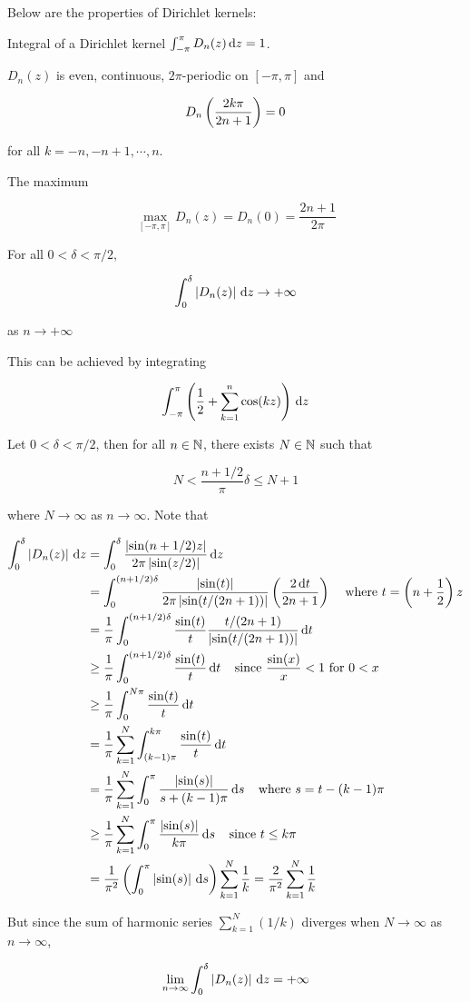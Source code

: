 \documentclass[a4paper,12pt]{article}
\begin{document}
\begin{pst}
  Below are the properties of Dirichlet kernels:

  \begin{alist}
    \item Integral of a Dirichlet kernel $\int_{-\pi}^{\pi}D_{n}(z)\,\mathrm{d} z=1$.
    \item $D_{n}(z)$ is even, continuous, $2\pi$-periodic on $[-\pi,\pi]$ and
    
    $$D_{n}\left( \frac{2k\pi}{2n+1}\right)=0$$\s

    for all $k=-n,-n+1,\cdots,n$.
    \item The maximum
    
    $$\max_{[-\pi,\pi]}D_{n}(z)=D_{n}(0)=\frac{2n+1}{2\pi}$$
    \item For all $0<\delta<\pi/2$,
    
    $$\int_{0}^{\delta}\left| D_{n}(z)\right|\,\mathrm{d} z\to+\infty$$\s

    as $n\to+\infty$
  \end{alist}

  \prf{} This can be achieved by integrating

  $$\int_{-\pi}^{\pi}\left( \frac{1}{2}+\sum_{k=1}^{n}\cos(kz)\right)\,\mathrm{d} z$$\s
  
   Let $0<\delta<\pi/2$, then for all $n\in\mathbb{N}$, there exists $N\in\mathbb{N}$ such that

  $$N<\frac{n+1/2}{\pi}\delta\leq N+1$$\s

  where $N\to\infty$ as $n\to\infty$. Note that
  
  $$\begin{aligned}[t]
    \int_{0}^{\delta}\left| D_{n}(z)\right|\,\mathrm{d} z&=\int_{0}^{\delta}\frac{\left| \sin(n+1/2)z\right|}{2\pi\left| \sin(z/2)\right|}\,\mathrm{d} z\\
    &=\int_{0}^{(n+1/2)\delta}\frac{\left| \sin(t)\right|}{2\pi\left| \sin(t/(2n+1))\right|}\left( \frac{2\,\mathrm{d} t}{2n+1}\right)\;\;\;\;\text{where }t=\left( n+\frac{1}{2}\right)z\\
    &=\frac{1}{\pi}\int_{0}^{(n+1/2)\delta}\frac{\sin(t)}{t}\frac{t/(2n+1)}{\left| \sin(t/(2n+1))\right|}\,\mathrm{d} t\\
    &\geq\frac{1}{\pi}\int_{0}^{(n+1/2)\delta}\frac{\sin(t)}{t}\,\mathrm{d} t\;\;\;\;\text{since }\frac{\sin(x)}{x}<1\text{ for }0<x\\
    &\geq\frac{1}{\pi}\int_{0}^{N\pi}\frac{\sin(t)}{t}\,\mathrm{d} t\\
    &=\frac{1}{\pi}\sum_{k=1}^{N}\int_{(k-1)\pi}^{k\pi}\frac{\sin(t)}{t}\,\mathrm{d} t\\
    &=\frac{1}{\pi}\sum_{k=1}^{N}\int_{0}^{\pi}\frac{\left| \sin(s)\right|}{s+(k-1)\pi}\,\mathrm{d} s\;\;\;\;\text{where }s=t-(k-1)\pi\\
    &\geq\frac{1}{\pi}\sum_{k=1}^{N}\int_{0}^{\pi}\frac{\left| \sin(s)\right|}{k\pi}\,\mathrm{d} s\;\;\;\;\text{since }t\leq k\pi\\
    &=\frac{1}{\pi^{2}}\left( \int_{0}^{\pi}\left| \sin(s)\right|\,\mathrm{d} s\right)\sum_{k=1}^{N}\frac{1}{k}=\frac{2}{\pi^{2}}\sum_{k=1}^{N}\frac{1}{k}
  \end{aligned}$$\s

  But since the sum of harmonic series $\sum_{k=1}^{N}(1/k)$ diverges when $N\to\infty$ as $n\to\infty$,

  $$\lim_{n\to\infty}\int_{0}^{\delta}\left| D_{n}(z)\right|\,\mathrm{d} z=+\infty$$
\end{pst}\n
\end{document}
